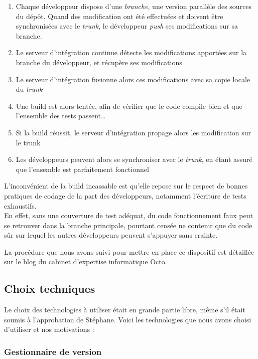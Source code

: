 \begin{enumerate}
	\item Chaque développeur dispose d'une \textit{branche}, une version parallèle des sources du dépôt. Quand des modification ont été effectuées et doivent être synchronisées avec le \textit{trunk}, le développeur \textit{push} ses modifications sur sa branche.
	\item Le serveur d'intégration continue détecte les modifications apportées sur la branche du développeur, et récupère ses modifications
	\item	Le serveur d'intégration fusionne alors ces modifications avec sa copie locale du \textit{trunk}
	\item Une build est alors tentée, afin de vérifier que le code compile bien et que l'ensemble des tests passent\ldots
	\item Si la build réussit, le serveur d'intégration propage alors les modification sur le trunk
	\item Les développeurs peuvent alors se synchroniser avec le \textit{trunk}, en étant assuré que l'ensemble est parfaitement fonctionnel
\end{enumerate}
L'inconvénient de la build incassable est qu'elle repose sur le respect de bonnes pratiques de codage de la part des développeurs, notamment l'écriture de tests exhaustifs.\\
En effet, sans une couverture de test adéquat, du code fonctionnement faux peut se retrouver dans la branche principale, pourtant censée ne contenir que du code sûr sur lequel les autres développeurs peuvent s'appuyer sans crainte.  

La procédure que nous avons suivi pour mettre en place ce dispositif est détaillée sur le blog du cabinet d'expertise informatique Octo\cite{build}.

\subsection{Choix techniques}

Le choix des technologies à utiliser était en grande partie libre, même s'il était soumis à l'approbation de Stéphane. Voici les technologies que nous avons choisi d'utiliser et nos motivations :

\subsubsection{Gestionnaire de version}


